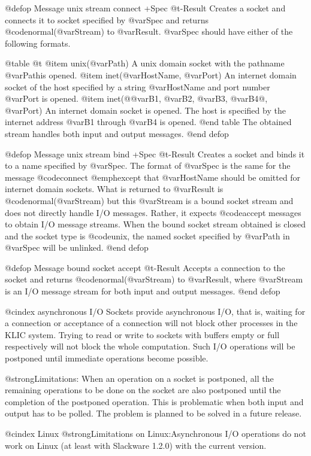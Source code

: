 {{{{@defop {Message} {unix stream} connect +Spec @t{-}Result
Creates a socket and connects it to socket specified by @var{Spec} and
returns @code{normal(@var{Stream})} to @var{Result}.  @var{Spec} should
have either of the following formats.

@table @t
@item unix(@var{Path})
A unix domain socket with the pathname @var{Path}is opened.
@item inet(@var{HostName}, @var{Port})
An internet domain socket of the host specified by a string
@var{HostName} and port number @var{Port} is opened.
@item inet(@{@var{B1}, @var{B2}, @var{B3}, @var{B4}@}, @var{Port})
An internet domain socket is opened.  The host is specified by the
internet address @var{B1} through @var{B4} is opened.
@end table
The obtained stream handles both input and output messages.
@end defop

@defop {Message} {unix stream} bind +Spec @t{-}Result
Creates a socket and binds it to a name specified by @var{Spec}.  The
format of @var{Spec} is the same for the message @code{connect}
@emph{except} that @var{HostName} should be omitted for internet domain
sockets.  What is returned to @var{Result} is
@code{normal(@var{Stream})} but this @var{Stream} is a bound socket
stream and does not directly handle I/O messages.  Rather, it expects
@code{accept} messages to obtain I/O message streams.
When the bound socket stream obtained is closed and the socket type is
@code{unix}, the named socket specified by @var{Path} in @var{Spec} will
be unlinked.
@end defop

@defop {Message} {bound socket} accept @t{-}Result
Accepts a connection to the socket and returns
@code{normal(@var{Stream})} to @var{Result}, where @var{Stream} is an
I/O message stream for both input and output messages.
@end defop

@cindex asynchronous I/O
Sockets provide asynchronous I/O, that is, waiting for a connection or
acceptance of a connection will not block other processes in the KLIC
system.  Trying to read or write to sockets with buffers empty or full
respectively will not block the whole computation.  Such I/O operations
will be postponed until immediate operations become possible.

@strong{Limitations:} When an operation on a socket is postponed, all
the remaining operations to be done on the socket are also postponed
until the completion of the postponed operation.  This is problematic
when both input and output has to be polled.  The problem is planned to
be solved in a future release.

@cindex Linux
@strong{Limitations on Linux:}Asynchronous I/O operations do not work on
Linux (at least with Slackware 1.2.0) with the current version.

}}}}
